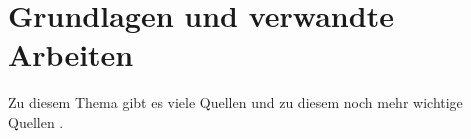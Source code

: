 
\chapter{Grundlagen und verwandte Arbeiten}
\label{cha:related_work}

\blindmathtrue
\Blindtext[11]

Zu diesem Thema gibt es viele Quellen \Cite{Report2019,Conference2019}  und zu diesem noch mehr wichtige Quellen \Cite{Article2019,Book2019}.

%
%
%
